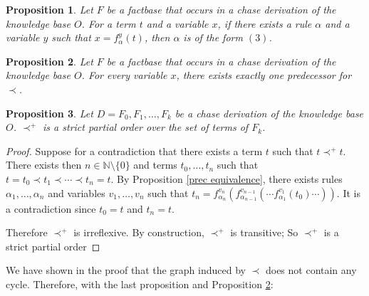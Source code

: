 \documentclass{article}
\newtheorem{proposition}{Proposition}[section]
\theoremstyle{definition}
\theoremstyle{remark}
\def \N {\mathbb N}
\begin{document}
\begin{proposition} 
Let $F$ be a factbase that occurs in a chase derivation of the knowledge base $O$. For a term $t$ and a variable $x$, if there exists a rule $\alpha$ and a variable $y$ such that $x= f_\alpha^y(t)$, then $\alpha$ is of the form $(3)$.
\end{proposition}



\begin{proposition} \label{only one predecessor}
Let $F$ be a factbase that occurs in a chase derivation of the knowledge base $O$. For every variable $x$, there exists exactly one predecessor for $\prec$.
\end{proposition}




\begin{proposition} \label{partial_order}
Let $D = F_0,F_1,\ldots,F_k$ be a chase derivation of the knowledge base $O$. $\prec^+$ is a strict partial order over the set of terms of $F_k$.
\end{proposition}

\begin{proof}
Suppose for a contradiction that there exists a term $t$ such that $t \prec^+ t$. There exists then $n \in \N \setminus \{0\}$ and terms $t_0,\ldots,t_n$ such that $t=t_0 \prec t_1 \prec \cdots \prec t_n = t$. By Proposition \ref{prec equivalence}, there exists rules $\alpha_1,\ldots, \alpha_n$ and variables $v_1,\ldots,v_n$ such that $t_n = f_{\alpha_n}^{v_n}(f_{\alpha_{n-1}}^{v_{n-1}}(\cdots f_{\alpha_1}^{v_1}(t_0)\cdots))$. It is a contradiction since $t_0 = t$ and $t_n=t$.

Therefore $\prec^+$ is irreflexive. By construction, $\prec^+$ is transitive; So $\prec^+$ is a strict partial order

\end{proof}

We have shown in the proof that the graph induced by $\prec$ does not contain any cycle. Therefore, with the last proposition and Proposition \ref{only one predecessor}: 
\end{document}
